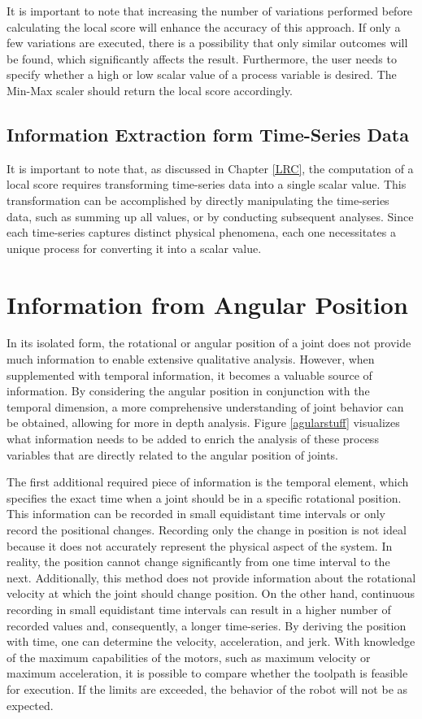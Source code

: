 \documentclass[conference]{IEEEtran}
\begin{document}
It is important to note that increasing the number of variations performed before calculating the local score will enhance the accuracy of this approach. If only a few variations are executed, there is a possibility that only similar outcomes will be found, which significantly affects the result. Furthermore, the user needs to specify whether a high or low scalar value of a process variable is desired. The Min-Max scaler should return the local score accordingly. 

\subsection{Information Extraction form Time-Series Data}\label{extraction}
It is important to note that, as discussed in Chapter \ref{LRC}, the computation of a local score requires transforming time-series data into a single scalar value. This transformation can be accomplished by directly manipulating the time-series data, such as summing up all values, or by conducting subsequent analyses. Since each time-series captures distinct physical phenomena, each one necessitates a unique process for converting it into a scalar value.




\section{Information from Angular Position}
In its isolated form, the rotational or angular position of a joint does not provide much information to enable extensive qualitative analysis. However, when supplemented with temporal information, it becomes a valuable source of information. By considering the angular position in conjunction with the temporal dimension, a more comprehensive understanding of joint behavior can be obtained, allowing for more in depth analysis. 
Figure \ref{agularstuff} visualizes what information needs to be added to enrich the analysis of these process variables that are directly related to the angular position of joints.



The first additional required piece of information is the temporal element, which specifies the exact time when a joint should be in a specific rotational position. This information can be recorded in small equidistant time intervals or only record the positional changes. Recording only the change in position is not ideal because it does not accurately represent the physical aspect of the system. In reality, the position cannot change significantly from one time interval to the next. Additionally, this method does not provide information about the rotational velocity at which the joint should change position. On the other hand, continuous recording in small equidistant time intervals can result in a higher number of recorded values and, consequently, a longer time-series. By deriving the position with time, one can determine the velocity, acceleration, and jerk. With knowledge of the maximum capabilities of the motors, such as maximum velocity or maximum acceleration, it is possible to compare whether the toolpath is feasible for execution. If the limits are exceeded, the behavior of the robot will not be as expected.
\end{document}
